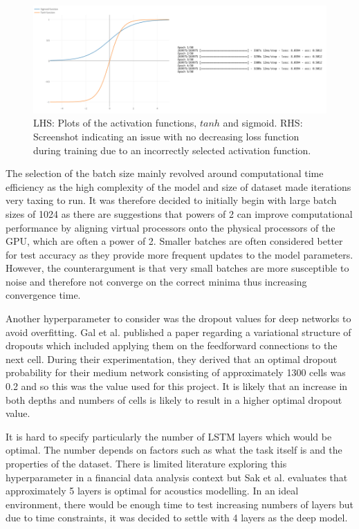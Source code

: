 \documentclass[10pt,onecolumn,letterpaper]{article}
\begin{document}
\begin{figure}[!hbt!]
\centering
\includegraphics[width=15.5cm]{tanhandsigmoidcomb.png}
\caption{LHS: Plots of the activation functions, $tanh$ and sigmoid. RHS: Screenshot indicating an issue with no decreasing loss function during training due to an incorrectly selected activation function.}
\end{figure}

The selection of the batch size mainly revolved around computational time efficiency as the high complexity of the model and size of dataset made iterations very taxing to run. It was therefore decided to initially begin with large batch sizes of 1024 as there are suggestions that powers of 2 can improve computational performance by aligning virtual processors onto the physical processors of the GPU, which are often a power of 2. Smaller batches are often considered better for test accuracy as they provide more frequent updates to the model parameters. However, the counterargument is that very small batches are more susceptible to noise and therefore not converge on the correct minima thus increasing convergence time.

Another hyperparameter to consider was the dropout values for deep networks to avoid overfitting. Gal et al.\cite{Gal} published a paper regarding a variational structure of dropouts which included applying them on the feedforward connections to the next cell. During their experimentation, they derived that an optimal dropout probability for their medium network consisting of approximately 1300 cells was 0.2 and so this was the value used for this project. It is likely that an increase in both depths and numbers of cells is likely to result in a higher optimal dropout value.

It is hard to specify particularly the number of LSTM layers which would be optimal. The number depends on factors such as what the task itself is and the properties of the dataset. There is limited literature exploring this hyperparameter in a financial data analysis context but Sak et al.\cite{Sak} evaluates that approximately 5 layers is optimal for acoustics modelling. In an ideal environment, there would be enough time to test increasing numbers of layers but due to time constraints, it was decided to settle with 4 layers as the deep model. 
\end{document}

